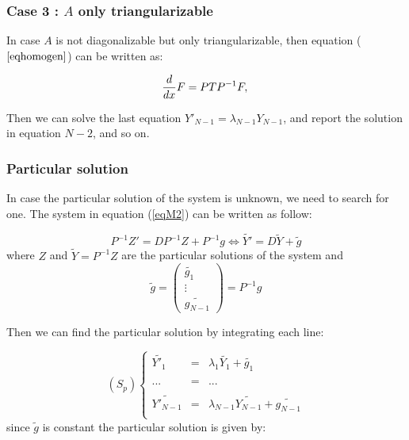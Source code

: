 \documentclass[a4paper,12pt]{article}
\begin{document}
 
 \subsubsection*{Case 3 : $A$ only triangularizable}
 In case $A$ is not diagonalizable but only triangularizable, then equation ($\ref{eqhomogen}$) can be written as:
 
  \begin{equation}
\frac{d}{dx}F=P T P^{-1} F , \\
\label{eqhomogenTriangle}
\end{equation}

Then we can solve the last equation $Y'_{N-1} = \lambda_{N-1} Y_{N-1}$, and report the solution in equation $N-2$, and so on.
 
\subsubsection{Particular solution}
In case the particular solution of the system is unknown, we need to search for one. The system in equation (\ref{eqM2}) can be written as follow:

\begin{equation}
P^{-1} Z' = D P^{-1} Z + P^{-1} g  \Leftrightarrow \widetilde{Y'} = D \widetilde{Y} +  \widetilde{g}
\end{equation}
where $Z$  and $\widetilde{Y}= P^{-1} Z$ are the particular solutions of the system and 
\begin{equation}
\widetilde{g} = \begin{pmatrix}
\widetilde{g_1} \\
  \vdots\\
 \widetilde{g_{N-1}}\end{pmatrix} = P^{-1} g
\end{equation}

Then we can find the particular solution by integrating each line:

$$(S_p)\left\lbrace
\begin{array}{lcl}
\widetilde{Y'_1} &=& \lambda_1 \widetilde{Y_1} + \widetilde{g_1} \\
 & & \\
... &=& ...\\
 & & \\
\widetilde{Y'_{N-1}} &=& \lambda_{N-1} \widetilde{Y_{N-1}} + \widetilde{g_{N-1}}\\
\end{array}\right.$$
since $\widetilde{g}$ is constant the particular solution is given by:
\end{document}
